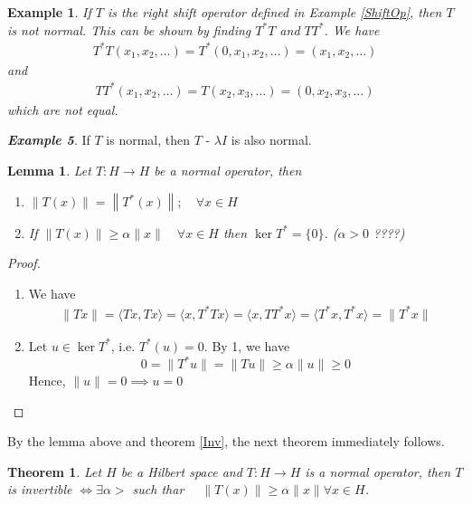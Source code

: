 \documentclass{report}
\newtheorem{thm}{Theorem}
\newtheorem{lem}{Lemma}
\newtheorem{exm}{Example}
\begin{document}
\begin{exm}
  If $T$ is the right shift operator defined in Example \ref{ShiftOp}, then $T$ is not normal. This can be shown by finding $T^{*}T$ and $TT^{*}$. We have
  $$
  \begin{aligned}
    T^{*}T(x_{1},x_{2},\dots) = T^{*}(0,x_{1},x_{2},\dots) = (x_{1},x_{2},\dots)
  \end{aligned}
  $$
  and
  $$
  \begin{aligned}
    TT^{*}(x_{1},x_{2},\dots) = T(x_{2},x_{3},\dots) = (0,x_{2},x_{3},\dots)
  \end{aligned}
  $$
  which are not equal.
\end{exm}

\textbf{\textit{Example 5}}. If $T$ is normal, then $T$ - $\lambda I$ is also normal.\\


\begin{lem}
Let $T: H \rightarrow H$ be a normal operator, then
  \begin{enumerate}
    \item $\|T(x)\|=\left\|T^{*}(x)\right\| ; \quad \forall x \in H$
    \item If $\|T(x)\| \geqslant \alpha\|x\| \quad \forall x \in H$ then $\operatorname{ker} T^{*}=\{0\}$. ($\alpha>0$ ????)
  \end{enumerate}
\end{lem}
\begin{proof}
  \begin{enumerate}
    \item We have
      $$
      \begin{aligned}
        \lVert Tx\rVert = \langle Tx,Tx\rangle = \langle x,T^{*}Tx\rangle = \langle x,TT^{*}x\rangle = \langle T^{*}x,T^{*}x\rangle = \lVert T^{*}x\rVert
      \end{aligned}
      $$
    \item Let $u\in\operatorname{ker}T^{*}$, i.e. $T^{*}(u)=0$. By 1, we have
      $$
      0=\lVert T^{*}u\rVert=\lVert Tu\rVert\geq\alpha\lVert u\rVert\geq 0
      $$
      Hence, $\lVert u\rVert=0\implies u=0$
  \end{enumerate}
\end{proof}

By the lemma above and theorem \ref{Inv}, the next theorem immediately follows.

\begin{thm}
Let $H$ be a Hilbert space and $T: H \rightarrow H$ is a normal operator, then
$T$ is invertible $\Longleftrightarrow \exists \alpha>$ such thar $\quad\|T(x)\| \geqslant \alpha\|x\| \forall x \in H$.
\end{thm}
\end{document}

